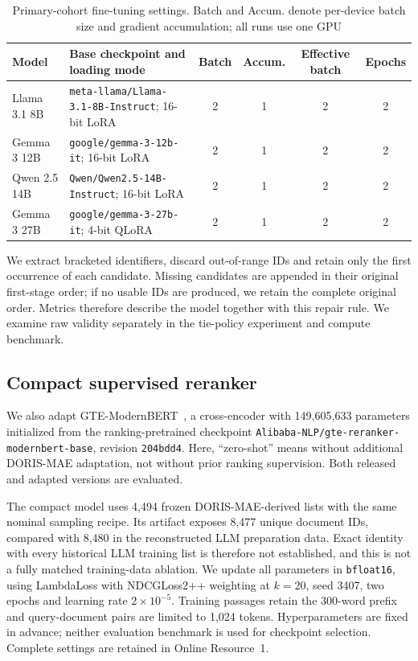 \documentclass[pdflatex,sn-basic,Numbered]{sn-jnl}%
\theoremstyle{thmstyleone}%
\theoremstyle{thmstyletwo}%
\theoremstyle{thmstylethree}%
\begin{document}
\begin{table}[t]


\centering
\scriptsize
\setlength{\tabcolsep}{4pt}
\renewcommand{\arraystretch}{1.08}
\begin{tabularx}{\textwidth}{p{} X c c c c}
\hline
Model & Base checkpoint and loading mode & Batch & Accum. & Effective batch & Epochs \\
\hline
Llama 3.1 8B & \texttt{meta-llama/\allowbreak Llama-3.1-8B-Instruct}; 16-bit LoRA & 2 & 1 & 2 & 2 \\
Gemma 3 12B & \texttt{google/gemma-3-12b-it}; 16-bit LoRA & 2 & 1 & 2 & 2 \\
Qwen 2.5 14B & \texttt{Qwen/Qwen2.5-14B-Instruct}; 16-bit LoRA & 2 & 1 & 2 & 2 \\
Gemma 3 27B & \texttt{google/gemma-3-27b-it}; 4-bit QLoRA & 2 & 1 & 2 & 2 \\
\hline
\end{tabularx}


\caption{Primary-cohort fine-tuning settings. Batch and Accum. denote per-device batch size and gradient accumulation; all runs use one GPU}
\label{tab:model-training-settings}
\end{table}

We extract bracketed identifiers, discard out-of-range IDs and retain only the
first occurrence of each candidate. Missing candidates are appended in their
original first-stage order; if no usable IDs are produced, we retain the complete
original order. Metrics therefore describe the model together with this repair
rule. We examine raw validity separately in the tie-policy experiment and
compute benchmark.

\subsection{Compact supervised reranker}
\label{sec:compact-training}
We also adapt GTE-ModernBERT~\cite{gte-modernbert}, a cross-encoder with
149,605,633 parameters initialized from the ranking-pretrained checkpoint
\texttt{Alibaba-NLP/gte-reranker-modernbert-base}, revision \texttt{204bdd4}.
Here, ``zero-shot'' means without additional DORIS-MAE adaptation, not without
prior ranking supervision. Both released and adapted versions are evaluated.

The compact model uses 4,494 frozen DORIS-MAE-derived lists with the same nominal
sampling recipe. Its artifact exposes 8,477 unique document IDs, compared with
8,480 in the reconstructed LLM preparation data. Exact identity with every
historical LLM training list is therefore not established, and this is not a
fully matched training-data ablation. We update all parameters in
\texttt{bfloat16}, using LambdaLoss with NDCGLoss2++ weighting at $k=20$, seed
3407, two epochs and learning rate $2\times10^{-5}$. Training passages retain
the 300-word prefix and query-document pairs are limited to 1,024 tokens.
Hyperparameters are fixed in advance; neither evaluation benchmark is used for
checkpoint selection. Complete settings are retained in Online Resource~1.
\end{document}
